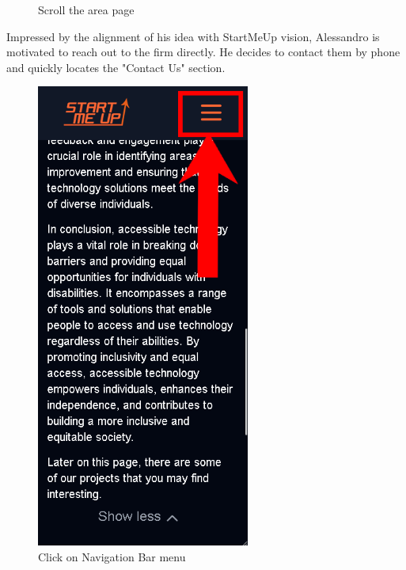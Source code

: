 \documentclass[11pt, letterpaper]{article}
\begin{document}
\begin{figure}[H]
\begin{minipage}[b]{0.4\textwidth}
    \caption{Scroll the area page}
    \label{fig:scenario4_8}
  \end{minipage}
\end{figure}
\noindent
Impressed by the alignment of his idea with StartMeUp vision, Alessandro is motivated to reach out to the firm directly. He decides to contact them by phone and quickly locates the "Contact Us" section.
\begin{figure}[H]
  \centering
  \begin{minipage}[b]{0.4\textwidth}
    \includegraphics[width=7cm]{images/Scenarios/Scenario4/Screen9.png}
    \caption{Click on Navigation Bar menu}
    \label{fig:scenario4_9}
  \end{minipage}
  \hfill
  \begin{minipage}[b]{0.4\textwidth}

\end{minipage}
\end{figure}
\end{document}
